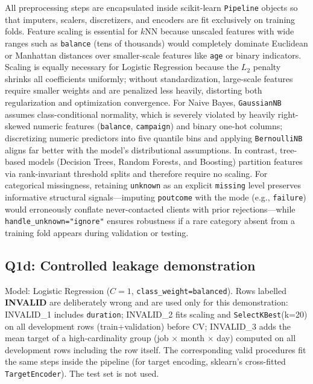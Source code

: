 All preprocessing steps are encapsulated inside scikit-learn \texttt{Pipeline} objects so that imputers, scalers, discretizers, and encoders are fit exclusively on training folds. Feature scaling is essential for $k$NN because unscaled features with wide ranges such as \texttt{balance} (tens of thousands) would completely dominate Euclidean or Manhattan distances over smaller-scale features like \texttt{age} or binary indicators. Scaling is equally necessary for Logistic Regression because the $L_2$ penalty shrinks all coefficients uniformly; without standardization, large-scale features require smaller weights and are penalized less heavily, distorting both regularization and optimization convergence. For Naive Bayes, \texttt{GaussianNB} assumes class-conditional normality, which is severely violated by heavily right-skewed numeric features (\texttt{balance}, \texttt{campaign}) and binary one-hot columns; discretizing numeric predictors into five quantile bins and applying \texttt{BernoulliNB} aligns far better with the model's distributional assumptions. In contrast, tree-based models (Decision Trees, Random Forests, and Boosting) partition features via rank-invariant threshold splits and therefore require no scaling. For categorical missingness, retaining \texttt{unknown} as an explicit \texttt{missing} level preserves informative structural signals---imputing \texttt{poutcome} with the mode (e.g., \texttt{failure}) would erroneously conflate never-contacted clients with prior rejections---while \texttt{handle\_unknown="ignore"} ensures robustness if a rare category absent from a training fold appears during validation or testing.

\subsection{Q1d: Controlled leakage demonstration}
Model: Logistic Regression ($C=1$, \texttt{class\_weight=balanced}). Rows labelled \textbf{INVALID} are
deliberately wrong and are used only for this demonstration: INVALID\_1 includes \texttt{duration};
INVALID\_2 fits scaling and \texttt{SelectKBest}(k=20) on all development rows (train+validation) before CV;
INVALID\_3 adds the mean target of a high-cardinality group (job $\times$ month $\times$ day) computed on all
development rows including the row itself. The corresponding valid procedures fit the same steps inside the
pipeline (for target encoding, sklearn's cross-fitted \texttt{TargetEncoder}). The test set is not used.

